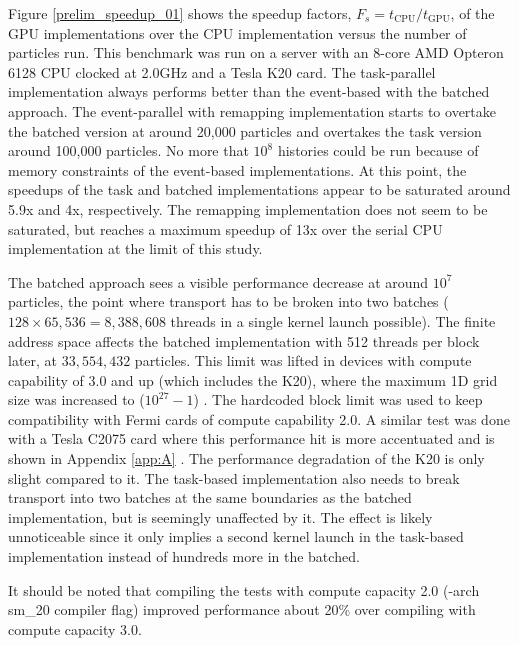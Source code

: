 Figure \ref{prelim_speedup_01} shows the speedup factors, $F_s=t_\mathrm{CPU}/t_\mathrm{GPU}$, of the GPU implementations over the CPU implementation versus the number of particles run.  This benchmark was run on a server with an 8-core AMD Opteron 6128 CPU clocked at 2.0GHz and a Tesla K20 card.  The task-parallel implementation always performs better than the event-based with the batched approach. The event-parallel with remapping implementation starts to overtake the batched version at around 20,000 particles and overtakes the task version around 100,000 particles.  No more that $10^8$ histories could be run because of memory constraints of the event-based implementations.  At this point, the speedups of the task and batched implementations appear to be saturated around 5.9x and 4x, respectively.  The remapping implementation does not seem to be saturated, but reaches a maximum speedup of 13x over the serial CPU implementation at the limit of this study.  %

The batched approach sees a visible performance decrease at around $10^7$ particles, the point where transport has to be broken into two batches ($128\times65,536=8,388,608$ threads in a single kernel launch possible).  The finite address space affects the batched implementation with 512 threads per block later,%
 at $33,554,432$ particles.  This limit was lifted in devices with compute capability of 3.0 %
and up (which includes the K20), where the maximum 1D grid size was increased to ($10^{27}-1$)%
 \cite{cuda}.  The hardcoded block limit was used to keep compatibility with Fermi cards of compute capability 2.0. %
   A similar test was done with a Tesla C2075 card where this performance hit is more accentuated %
   and is shown in Appendix \ref{app:A} .  The performance degradation of the K20 is only slight compared to it.   The task-based implementation also needs to break transport into two batches at the same boundaries as the batched implementation, but is seemingly unaffected by it.  The effect is likely unnoticeable since it only implies a second kernel launch in the task-based implementation instead of hundreds more in the batched.

It should be noted that compiling the tests with compute capacity 2.0 (-arch sm\_20 compiler flag) improved performance about 20\% over compiling with compute capacity 3.0. %

